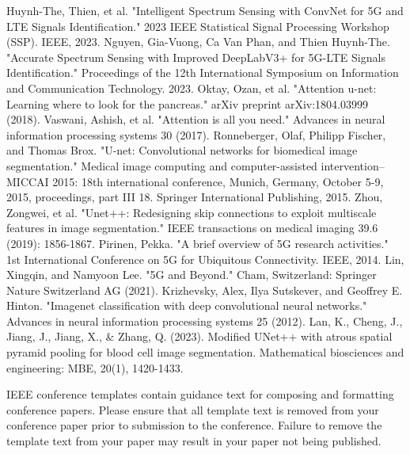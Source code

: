 \documentclass[journal]{IEEEtran} %
\begin{document}
\begin{thebibliography}{00}
     {Huynh-The, Thien, et al. "Intelligent Spectrum Sensing with ConvNet for 5G and LTE Signals Identification." 2023 IEEE Statistical Signal Processing Workshop (SSP). IEEE, 2023.}
     {Nguyen, Gia-Vuong, Ca Van Phan, and Thien Huynh-The. "Accurate Spectrum Sensing with Improved DeepLabV3+ for 5G-LTE Signals Identification." Proceedings of the 12th International Symposium on Information and Communication Technology. 2023.}
     {Oktay, Ozan, et al. "Attention u-net: Learning where to look for the pancreas." arXiv preprint arXiv:1804.03999 (2018).}
     {Vaswani, Ashish, et al. "Attention is all you need." Advances in neural information processing systems 30 (2017).}
     {Ronneberger, Olaf, Philipp Fischer, and Thomas Brox. "U-net: Convolutional networks for biomedical image segmentation." Medical image computing and computer-assisted intervention–MICCAI 2015: 18th international conference, Munich, Germany, October 5-9, 2015, proceedings, part III 18. Springer International Publishing, 2015.}
     {Zhou, Zongwei, et al. "Unet++: Redesigning skip connections to exploit multiscale features in image segmentation." IEEE transactions on medical imaging 39.6 (2019): 1856-1867.}
     {Pirinen, Pekka. "A brief overview of 5G research activities." 1st International Conference on 5G for Ubiquitous Connectivity. IEEE, 2014.}
     {Lin, Xingqin, and Namyoon Lee. "5G and Beyond." Cham, Switzerland: Springer Nature Switzerland AG (2021).}
     {Krizhevsky, Alex, Ilya Sutskever, and Geoffrey E. Hinton. "Imagenet classification with deep convolutional neural networks." Advances in neural information processing systems 25 (2012).}
     {Lan, K., Cheng, J., Jiang, J., Jiang, X., & Zhang, Q. (2023). Modified UNet++ with atrous spatial pyramid pooling for blood cell image segmentation. Mathematical biosciences and engineering: MBE, 20(1), 1420-1433.}
    
\end{thebibliography}
\vspace{12pt}
\color{red}
IEEE conference templates contain guidance text for composing and formatting conference papers. Please ensure that all template text is removed from your conference paper prior to submission to the conference. Failure to remove the template text from your paper may result in your paper not being published.
\end{document}
